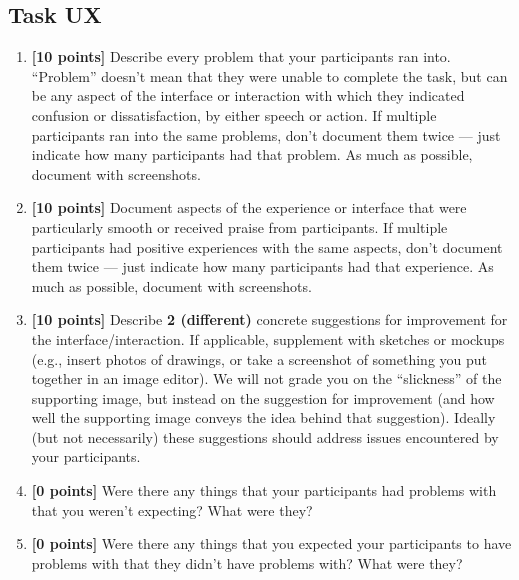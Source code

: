 \documentclass{article}
\begin{document}
\subsection{Task UX}
\begin{enumerate}
    \item \textbf{[10 points]} Describe every problem that your participants ran into. ``Problem'' doesn't mean that they were unable to complete the task, but can be any aspect of the interface or interaction with which they indicated confusion or dissatisfaction, by either speech or action. If multiple participants ran into the same problems, don't document them twice --- just indicate how many participants had that problem. As much as possible, document with screenshots.
    
    \item \textbf{[10 points]} Document aspects of the experience or interface that were particularly smooth or received praise from participants. If multiple participants had positive experiences with the same aspects, don't document them twice --- just indicate how many participants had that experience. As much as possible, document with screenshots.
    
    \item \textbf{[10 points]} Describe \textbf{2 (different)} concrete suggestions for improvement for the interface/interaction. If applicable, supplement with sketches or mockups (e.g., insert photos of drawings, or take a screenshot of something you put together in an image editor). We will not grade you on the ``slickness'' of the supporting image, but instead on the suggestion for improvement (and how well the supporting image conveys the idea behind that suggestion). Ideally (but not necessarily) these suggestions should address issues encountered by your participants.

    \item \textbf{[0 points]} Were there any things that your participants had problems with that you weren't expecting? What were they?

    \item \textbf{[0 points]} Were there any things that you expected your participants to have problems with that they didn't have problems with? What were they?

\end{enumerate}
\end{document}
